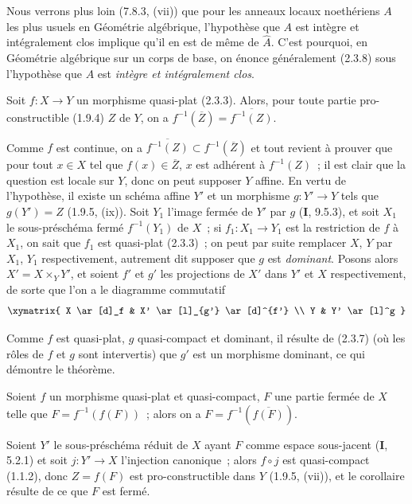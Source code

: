 \begin{remark}[2.3.9]
\label{IV.2.3.9-fr}
Nous verrons plus loin (7.8.3, (vii)) que pour les anneaux locaux noethériens
$A$ les plus usuels en Géométrie algébrique, l'hypothèse que $A$ est intègre
et intégralement clos implique qu'il en est de même de $\widehat A$. C'est
pourquoi, en Géométrie algébrique sur un corps de base, on énonce généralement
(2.3.8) sous l'hypothèse que $A$ est \emph{intègre et intégralement clos}.
\end{remark}

\begin{theorem}[2.3.10]
\label{IV.2.3.10-fr}
Soit $f:X\to Y$ un morphisme quasi-plat \textup{(2.3.3)}. Alors, pour toute partie
pro-constructible \textup{(1.9.4)} $Z$ de $Y$, on a
$f^{-1}(\overline Z)=\overline{f^{-1}(Z)}$.
\end{theorem}

Comme $f$ est continue, on a
$\overline{f^{-1}(Z)}\subset f^{-1}(\overline Z)$ et tout revient à prouver
que pour tout $x\in X$ tel que $f(x)\in\overline Z$, $x$ est adhérent à
$f^{-1}(Z)$~; il est clair que la question est locale sur $Y$, donc on peut
supposer $Y$ affine. En vertu de l'hypothèse, il existe un schéma affine $Y'$
et un morphisme $g:Y'\to Y$ tels que $g(Y')=Z$ (1.9.5, (ix)). Soit $Y_1$
l'image fermée de $Y'$ par $g$ (\textbf{I}, 9.5.3), et soit $X_1$ le sous-préschéma
fermé $f^{-1}(Y_1)$ de $X$~; si $f_1:X_1\to Y_1$ est la restriction de $f$ à
$X_1$, on sait que $f_1$ est quasi-plat (2.3.3)~; on peut par suite remplacer
$X$, $Y$ par $X_1$, $Y_1$ respectivement, autrement dit supposer que $g$ est
\emph{dominant}. Posons alors $X'=X\times_Y Y'$, et soient $f'$ et $g'$ les
projections de $X'$ dans $Y'$ et $X$ respectivement, de sorte que l'on a le
diagramme commutatif
\[
\xymatrix{
  X \ar[d]_f & X' \ar[l]_{g'} \ar[d]^{f'} \\
  Y & Y' \ar[l]^g
}
\]

Comme $f$ est quasi-plat, $g$ quasi-compact et dominant, il résulte de (2.3.7)
(où les rôles de $f$ et $g$ sont intervertis) que $g'$ est un morphisme
dominant, ce qui démontre le théorème.

\begin{corollary}[2.3.11]
\label{IV.2.3.11-fr}
Soient $f$ un morphisme quasi-plat et quasi-compact, $F$ une partie fermée de
$X$ telle que $F=f^{-1}(f(F))$~; alors on a
$F=f^{-1}(\overline{f(F)})$.
\end{corollary}

Soient $Y'$ le sous-préschéma réduit de $X$ ayant $F$ comme espace sous-jacent
(\textbf{I}, 5.2.1) et soit $j:Y'\to X$ l'injection canonique~; alors $f\circ j$ est
quasi-compact (1.1.2),
donc $Z=f(F)$ est pro-constructible dans $Y$ (1.9.5, (vii)), et le corollaire
résulte de ce que $F$ est fermé.

